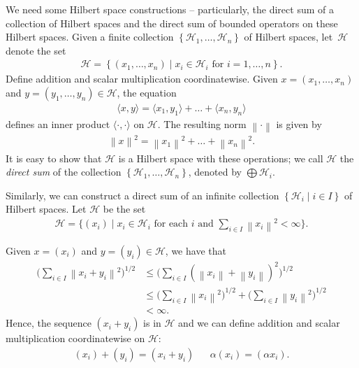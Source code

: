 \documentclass[11pt,a4paper]{report}
\theoremstyle{plain}
\theoremstyle{definition}
\newcommand{\1}{\mathbbm{1}}
\renewcommand{\H}{\mathcal{H}}
\renewcommand{\oplus}{\textstyle\bigoplus}
\begin{document}
We need some Hilbert space constructions -- particularly, the direct sum of a 
collection of Hilbert spaces and the direct sum of bounded operators on these 
Hilbert spaces. Given a finite collection $\left\{\H_1,\dots,\H_n\right\}$ of Hilbert 
spaces, let~$\H$ denote the set
\begin{align*}
	\H  = \left\{(x_1,\dots,x_n) \mid x_i \in \H_i \mbox { for } i=1,\dots,n \right\}.
\end{align*}
Define addition and scalar multiplication coordinatewise. Given 
$x=(x_1,\dots,x_n)$ and $y=(y_1,\dots,y_n) \in \H$, the equation
\begin{align*}
	\langle x,y\rangle = \langle x_1,y_1\rangle + \dots + \langle x_n,y_n \rangle
\end{align*}
defines an inner product $\langle\cdot,\cdot\rangle$ on $\H$. The resulting norm 
$\left\|\cdot\right\|$ is given by
\begin{align*}
	\left\|x\right\|^2 = \left\|x_1\right\|^2 + \dots + \left\|x_n\right\|^2.
\end{align*}
It is easy to show that $\H$ is a Hilbert space with these operations; we 
call $\H$ the \emph{direct sum} of the collection 
$\left\{\H_1,\dots,\H_n\right\}$, denoted by $\oplus\H_i$.

Similarly, we can construct a direct sum of an infinite collection 
$\left\{\H_i \mid i\in I\right\}$ of Hilbert spaces. Let $\H$ be the set
\begin{align*}
	\H= \Big\{(x_i) \mid x_i \in \H_i \mbox{ for each }i 
					\mbox{ and } \sum_{i\in I}{\left\|x_i\right\|^2} < \infty \Big\}.
\end{align*}

Given $x=(x_i)$ and $y=(y_i)\in\H$, we have that
\begin{align*}
			\Big(\sum_{i\in I}{\left\|x_i+y_i\right\|^2}\Big)^{1/2}
	&\leq	\Big(\sum_{i\in I}{(\left\|x_i\right\|+\left\|y_i\right\|)^2}\Big)^{1/2}		\\
	&\leq	\Big(\sum_{i\in I}{\left\|x_i\right\|^2}\Big)^{1/2}		+
						\Big(\sum_{i\in I}{\left\|y_i\right\|^2}\Big)^{1/2}					\\
	&< 		\infty.
\end{align*}
Hence, the sequence $(x_i+y_i)$ is in $\H$ and we can define addition and 
scalar multiplication coordinatewise on $\H$:
\begin{align*}
	(x_i)+(y_i)=(x_i+y_i) && \alpha(x_i) = (\alpha x_i).
\end{align*}
\end{document}
